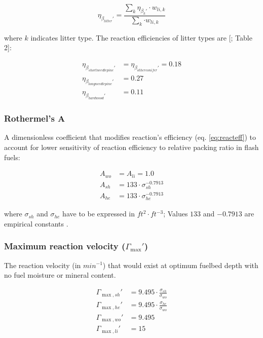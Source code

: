 \documentclass[]{book}
\begin{document}
\begin{equation}
\eta_{\beta_{litter}'} = \frac{\sum_{k} {\eta_{\beta_{k}'}\cdot w_{li,k}}}{\sum_{k} {\cdot w_{li,k}}}
\end{equation}

where \(k\) indicates litter type. The reaction efficiencies of litter
types are {[}\citet{Prichard2013}; Table 2{]}:

\begin{eqnarray}
\eta_{\beta_{shortneedlepine}'} &= \eta_{\beta_{otherconifer}'} = 0.18\\
\eta_{\beta_{longneedlepine}'} &= 0.27\\
\eta_{\beta_{hardwood}'} &= 0.11
\end{eqnarray}

\subsubsection{Rothermel's A}\label{rothermels-a}

A dimensionless coefficient that modifies reaction's efficiency (eq.
\eqref{eq:reacteff}) to account for lower sensitivity of reaction
efficiency to relative packing ratio in flash fuels:

\begin{eqnarray}
A_{wo} &= A_{li} = 1.0\\
A_{sh} &= 133\cdot \sigma_{sh}^{-0.7913}\\
A_{he} &= 133\cdot \sigma_{he}^{-0.7913}
\end{eqnarray}

where \(\sigma_{sh}\) and \(\sigma_{he}\) have to be expressed in
\(ft^2\cdot ft^{-3}\); Values \(133\) and \(-0.7913\) are empirical
constants \citep{Rothermel1972}.

\subsubsection{\texorpdfstring{Maximum reaction velocity
(\(\Gamma_{\max}'\))}{Maximum reaction velocity (\textbackslash{}Gamma\_\{\textbackslash{}max\}')}}\label{maximum-reaction-velocity-gamma_max}

The reaction velocity (in \(min^{-1}\)) that would exist at optimum
fuelbed depth with no fuel moisture or mineral content.

\begin{eqnarray}
\Gamma_{\max, sh}' &= 9.495 \cdot \frac{\sigma_{sh}}{\sigma_{wo}}\\
\Gamma_{\max, he}' &= 9.495 \cdot \frac{\sigma_{he}}{\sigma_{wo}}\\
\Gamma_{\max, wo}' &= 9.495 \\
\Gamma_{\max, li}' &= 15 
\label{eq:maxreactvel}
\end{eqnarray}
\end{document}
